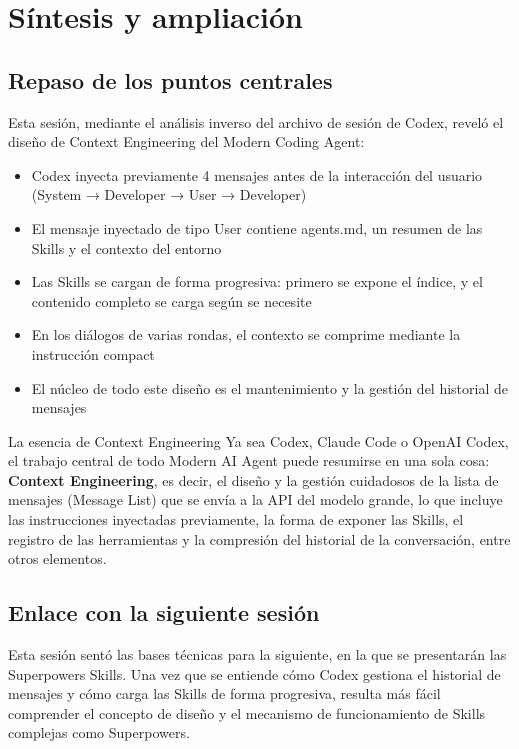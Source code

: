 \section{Síntesis y ampliación}

\subsection{Repaso de los puntos centrales}

Esta sesión, mediante el análisis inverso del archivo de sesión de Codex, reveló el diseño de Context Engineering del Modern Coding Agent:

\begin{itemize}
    \item Codex inyecta previamente 4 mensajes antes de la interacción del usuario (System → Developer → User → Developer)
    \item El mensaje inyectado de tipo User contiene agents.md, un resumen de las Skills y el contexto del entorno
    \item Las Skills se cargan de forma progresiva: primero se expone el índice, y el contenido completo se carga según se necesite
    \item En los diálogos de varias rondas, el contexto se comprime mediante la instrucción compact
    \item El núcleo de todo este diseño es el mantenimiento y la gestión del historial de mensajes
\end{itemize}

\begin{importantbox}{La esencia de Context Engineering}
Ya sea Codex, Claude Code o OpenAI Codex, el trabajo central de todo Modern AI Agent puede resumirse en una sola cosa: \textbf{Context Engineering}, es decir, el diseño y la gestión cuidadosos de la lista de mensajes (Message List) que se envía a la API del modelo grande, lo que incluye las instrucciones inyectadas previamente, la forma de exponer las Skills, el registro de las herramientas y la compresión del historial de la conversación, entre otros elementos.
\end{importantbox}

\subsection{Enlace con la siguiente sesión}

Esta sesión sentó las bases técnicas para la siguiente, en la que se presentarán las Superpowers Skills. Una vez que se entiende cómo Codex gestiona el historial de mensajes y cómo carga las Skills de forma progresiva, resulta más fácil comprender el concepto de diseño y el mecanismo de funcionamiento de Skills complejas como Superpowers.



